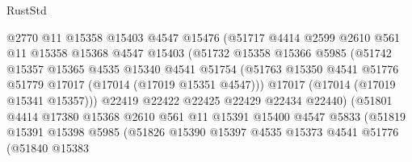 \begin{lexlean}{RustStd}
\begin{coremodule}
                            @2770
                            @11
                            @15358
                            @15403
                            @4547
                            @15476
                            (@51717
                              @4414
                              @2599
                              @2610
                              @561
                              @11
                              @15358
                              @15368
                              @4547
                              @15403
                              (@51732
                                @15358
                                @15366
                                @5985
                                (@51742
                                  @15357
                                  @15365
                                  @4535
                                  @15340
                                  @4541
                                  @51754
                                  (@51763
                                    @15350
                                    @4541
                                    @51776
                                    @51779
                                    @17017
                                    (@17014 (@17019 @15351 @4547)))
                                  @17017
                                  (@17014 (@17019 @15341 @15357)))
                                @22419
                                @22422
                                @22425
                                @22429
                                @22434
                                @22440)
                              (@51801
                                @4414
                                @17380
                                @15368
                                @2610
                                @561
                                @11
                                @15391
                                @15400
                                @4547
                                @5833
                                (@51819
                                  @15391
                                  @15398
                                  @5985
                                  (@51826
                                    @15390
                                    @15397
                                    @4535
                                    @15373
                                    @4541
                                    @51776
                                    (@51840
                                      @15383

\end{coremodule}
\end{lexlean}
